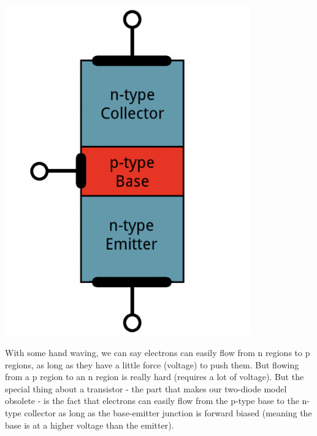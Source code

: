 \documentclass[a4paper, 11pt]{article} %
\begin{document}
\begin{center}
\includegraphics[width=300pt]{tran4}
\end{center}

With some hand waving, we can say electrons can easily flow from n regions to p regions, as long as they have a little force (voltage) to push them. But flowing from a p region to an n region is really hard (requires a lot of voltage). But the special thing about a transistor - the part that makes our two-diode model obsolete - is the fact that electrons can easily flow from the p-type base to the n-type collector as long as the base-emitter junction is forward biased (meaning the base is at a higher voltage than the emitter).
\end{document}
